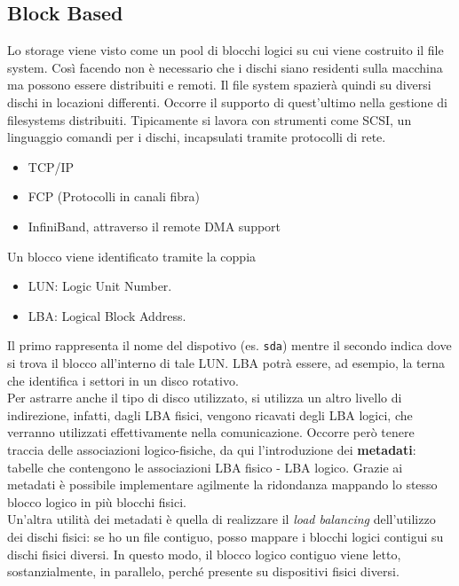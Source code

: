\documentclass{article}
\begin{document}
		\subsection{Block Based}
		Lo storage viene visto come un pool di blocchi logici su cui viene costruito il file system. Così facendo non è necessario che i dischi siano residenti sulla macchina ma possono essere distribuiti e remoti. Il file system spazierà quindi su diversi dischi in locazioni differenti. Occorre il supporto di quest'ultimo nella gestione di filesystems distribuiti.
		Tipicamente si lavora con strumenti come SCSI, un linguaggio comandi per i dischi, incapsulati tramite protocolli di rete.
		\begin{itemize}
		    \item TCP/IP
		    \item FCP (Protocolli in canali fibra)
		    \item InfiniBand, attraverso il remote DMA support
		\end{itemize}
		Un blocco viene identificato tramite la coppia 
		\begin{itemize}
		    \item LUN: Logic Unit Number.
		    \item LBA: Logical Block Address.
		\end{itemize}
		Il primo rappresenta il nome del dispotivo (es. \verb*|sda|) mentre il secondo indica dove si trova il blocco all’interno di tale LUN. LBA potrà essere, ad esempio, la terna che identifica i settori in un disco rotativo.\\
		
		Per astrarre anche il tipo di disco utilizzato, si utilizza un altro livello di indirezione, infatti, dagli LBA fisici, vengono ricavati degli LBA logici, che verranno utilizzati effettivamente nella comunicazione. Occorre però tenere traccia delle associazioni logico-fisiche, da qui l'introduzione dei \textbf{metadati}: tabelle che contengono le associazioni LBA fisico - LBA logico. Grazie ai metadati è possibile implementare agilmente la ridondanza mappando lo stesso blocco logico in più blocchi fisici.\\
		
		Un’altra utilità dei metadati è quella di realizzare il \emph{load balancing} dell’utilizzo dei dischi fisici: se ho un file contiguo, posso mappare i blocchi logici contigui su dischi fisici diversi. In questo modo, il blocco logico contiguo viene letto, sostanzialmente, in
		parallelo, perché presente su dispositivi fisici diversi.\\
		
\end{document}

